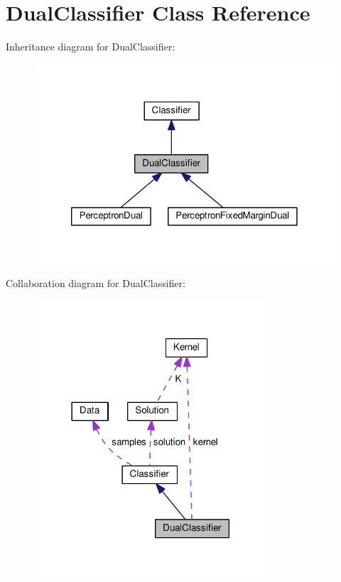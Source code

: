 \hypertarget{class_dual_classifier}{}\section{Dual\+Classifier Class Reference}
\label{class_dual_classifier}


Inheritance diagram for Dual\+Classifier\+:\nopagebreak
\begin{figure}[H]
\begin{center}
\leavevmode
\includegraphics[width=320pt]{class_dual_classifier__inherit__graph}
\end{center}
\end{figure}


Collaboration diagram for Dual\+Classifier\+:\nopagebreak
\begin{figure}[H]
\begin{center}
\leavevmode
\includegraphics[width=246pt]{class_dual_classifier__coll__graph}
\end{center}
\end{figure}
